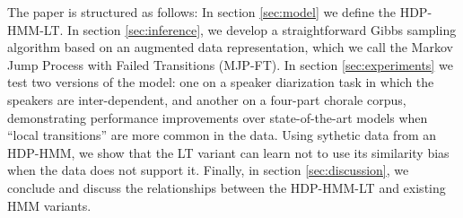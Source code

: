 The paper is structured as follows: In section \ref{sec:model} we
define the HDP-HMM-LT.  In section \ref{sec:inference}, we develop a
straightforward Gibbs sampling algorithm 
based on an augmented data representation, which we call the Markov
Jump Process with Failed Transitions (MJP-FT).  In section
\ref{sec:experiments} we test two versions of the model: one
on a speaker diarization task in which the speakers are
inter-dependent, and another on a four-part chorale corpus,
demonstrating performance improvements over state-of-the-art 
models when ``local transitions''
are more common in the data.  Using sythetic data from an HDP-HMM, we
show that the LT variant can learn not to use its similarity bias when
the data does not support it.  Finally, in section \ref{sec:discussion}, we 
conclude and discuss the relationships between the HDP-HMM-LT and
existing HMM variants.